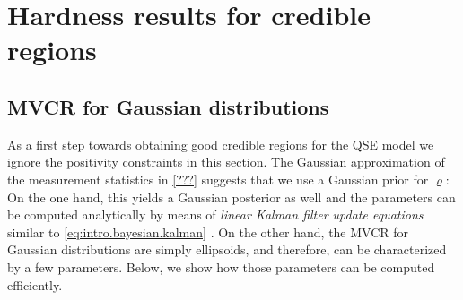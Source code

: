 \section{Hardness results for credible regions}
\label{sec:bayesian}


\subsection{MVCR for Gaussian distributions}
\label{sub:bayesian.gaussian}

As a first step towards obtaining good credible regions for the QSE model we ignore the positivity constraints in this section.
The Gaussian approximation of the measurement statistics in \cref{???} suggests that we use a Gaussian prior for $\varrho$:
On the one hand, this yields a Gaussian posterior as well and the parameters can be computed analytically by means of \emph{linear Kalman filter update equations} similar to \cref{eq:intro.bayesian.kalman} \cite[Sec.\ 2.4]{Audenaert_2009_Quantum}.
On the other hand, the MVCR for Gaussian distributions are simply ellipsoids, and therefore, can be characterized by a few parameters.
Below, we show how those parameters can be computed efficiently.

